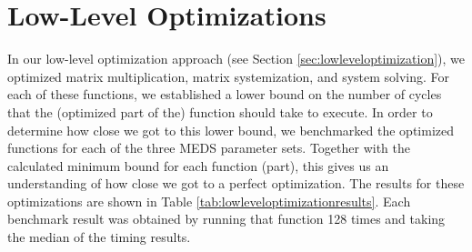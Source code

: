 \documentclass[11pt,a4paper]{report}
\theoremstyle{definition}
\begin{document}
\section{Low-Level Optimizations}
\label{sec:resultslowlevel}
In our low-level optimization approach (see Section \ref{sec:lowleveloptimization}), we optimized matrix multiplication, matrix systemization, and system solving. For each of these functions, we established a lower bound on the number of cycles that the (optimized part of the) function should take to execute. In order to determine how close we got to this lower bound, we benchmarked the optimized functions for each of the three MEDS parameter sets. Together with the calculated minimum bound for each function (part), this gives us an understanding of how close we got to a perfect optimization. The results for these optimizations are shown in Table \ref{tab:lowleveloptimizationresults}. Each benchmark result was obtained by running that function 128 times and taking the median of the timing results.
\end{document}
